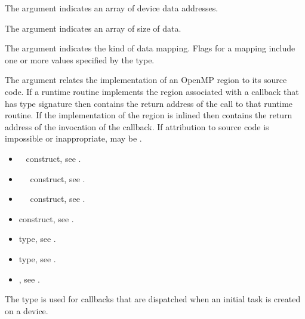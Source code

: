 The  argument indicates an array of device data addresses.

The  argument indicates an array of size of data.

The  argument indicates the kind of data mapping. 
Flags for a mapping include one or more values specified by the 
 type.

The  argument relates the implementation of an OpenMP region
to its source code. If a runtime routine implements the region associated with
a callback that has type signature  then
 contains the return address of the call to that runtime routine.
If the implementation of the region is inlined then  contains the
return address of the invocation of the callback. If attribution to source code
is impossible or inappropriate, may be .

\crossreferences
\begin{itemize}
\item {}~ construct, see .

\item {}~~ construct,
see .

\item {}~~ construct,
see .

\item {} construct, see .

\item {} type, see .

\item {} type, see .

\item {}, 
see .
\end{itemize}



\label{sec:ompt_callback_target_submit_t}
\summary
The  type is used for callbacks that are
dispatched when an initial task is created on a device.

